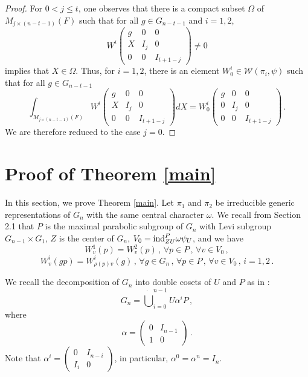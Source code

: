 \documentclass[12pt]{amsart}
\begin{document}
\begin{proof}
For $0 < j \leq t$, one observes that there is a compact subset $\Omega$ of $M_{j \times (n-t-1)}(F)$ such that for all $g \in G_{n-t-1}$ and $i=1,2$, 
$$W^i \begin{pmatrix}
g & 0 & 0 \\
X & I_j & 0\\
0 & 0 & I_{t+1-j}
\end{pmatrix}
\neq 0$$
implies that $X \in \Omega$. 
Thus, for $i=1,2$, there is an element $W^i_0 \in {{\mathcal {W}}}(\pi_i, \psi)$ such that for all $g \in G_{n-t-1}$
$$\int_{M_{j \times (n-t-1)}(F)} W^i \begin{pmatrix}
g & 0 & 0 \\
X & I_j & 0\\
0 & 0 & I_{t+1-j}
\end{pmatrix} dX= W^i_0 \begin{pmatrix}
g & 0 & 0 \\
0 & I_j & 0\\
0 & 0 & I_{t+1-j}
\end{pmatrix}\,.$$
We are therefore reduced to the case $j=0$. 
\end{proof}

\section{Proof of Theorem \ref{main}}

In this section, we prove Theorem \ref{main}. 
Let $\pi_1$ and $\pi_2$ be irreducible generic representations of $G_n$ with the same central character $\omega$. 
We recall from Section 2.1 that $P$ is the maximal parabolic subgroup of $G_n$ with Levi subgroup $G_{n-1} \times G_1$, $Z$ is the center of $G_n$, $V_0={ \rm ind}_{ZU}^P \omega\psi_U$, and we have
\begin{equation}\label{sec3equ1}
W^1_v(p)=W^2_v(p)\,,\, \forall p \in P\,,\,\forall v \in V_0\,,
\end{equation}
\begin{equation}\label{sec3equ2}
W^i_v(gp)=W^i_{\rho(p)v}(g)\,,\, \forall g \in G_n\,,\, \forall p \in P\,,\, \forall v \in V_0\,,\, i=1,2\,.
\end{equation}

We recall the decomposition of $G_n$ into double cosets of $U$ and $P$ as in \cite{Ch06}:
\[G_n = \dot\bigcup_{i=0}^{n-1}U \alpha^i P\,,\]
where 
$$\alpha=\begin{pmatrix}
0 & I_{n-1}\\
1 & 0
\end{pmatrix}\,.$$
Note that $\alpha^i=\begin{pmatrix}
0 & I_{n-i}\\
I_i & 0
\end{pmatrix}$, in particular, $\alpha^0=\alpha^n=I_n$. 
\end{document}
